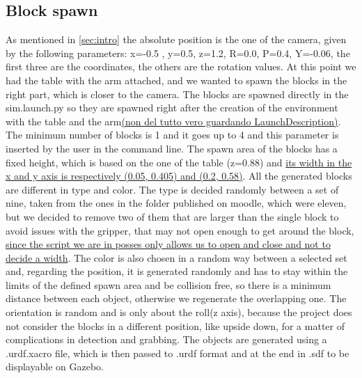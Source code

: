 \documentclass[12pt,a4paper]{article}
\begin{document}
\subsection{Block spawn}\label{subsec:blockspawn}
As mentioned in \ref{sec:intro} the absolute position is the one of the camera, given by the following parameters: x=-0.5 , y=0.5, z=1.2, R=0.0, P=0.4, Y=-0.06, the first three are the coordinates, the others are the rotation values. At this point we had the table with the arm attached, and we wanted to spawn the blocks in the right part, which is closer to the camera. The blocks are spawned directly in the sim.launch.py so they are spawned right after the creation of the environment with the table and the arm\uline{(non del tutto vero guardando LaunchDescription)}. The minimum number of blocks is 1 and it goes up to 4 and this parameter is inserted by the user in the command line. The spawn area of the blocks has a fixed height, which is based on the one of the table (z=0.88) and \uline{its width in the x and y axis is respectively (0.05, 0.405) and (0.2, 0.58)}. All the generated blocks are different in type and color. The type is decided randomly between a set of nine, taken from the ones in the folder published on moodle, which were eleven, but we decided to remove two of them that are larger than the single block to avoid issues with the gripper, that may not open enough to get around the block, \uline{since the script we are in posses only allows us to open and close and not to decide a width}. The color is also chosen in a random way between a selected set and, regarding the position, it is generated randomly and has to stay within the limits of the defined spawn area and be collision free, so there is a minimum distance between each object, otherwise we regenerate the overlapping one. The orientation is random and is only about the roll(z axis), because the project does not consider the blocks in a different position, like upside down, for a matter of complications in detection and grabbing.
The objects are generated using a .urdf.xacro file, which is then passed to .urdf format and at the end in .sdf to be displayable on Gazebo. 
\end{document}
